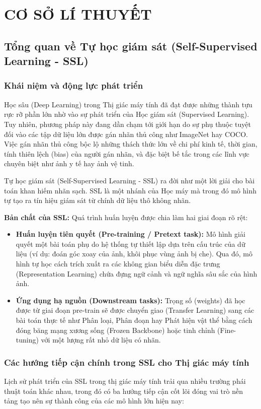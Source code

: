 \chapter{CƠ SỞ LÍ THUYẾT}
\section{Tổng quan về Tự học giám sát (Self-Supervised Learning - SSL)}
\subsection{Khái niệm và động lực phát triển}
Học sâu (Deep Learning) trong Thị giác máy tính đã đạt được những thành tựu rực rỡ phần lớn nhờ vào sự phát triển của Học giám sát (Supervised Learning). Tuy nhiên, phương pháp này đang dần chạm tới giới hạn do sự phụ thuộc tuyệt đối vào các tập dữ liệu lớn được gán nhãn thủ công như ImageNet hay COCO. Việc gán nhãn thủ công bộc lộ những thách thức lớn về chi phí kinh tế, thời gian, tính thiên lệch (bias) của người gán nhãn, và đặc biệt bế tắc trong các lĩnh vực chuyên biệt như ảnh y tế hay ảnh vệ tinh.

Tự học giám sát (Self-Supervised Learning - SSL) ra đời như một lời giải cho bài toán khan hiếm nhãn sạch. SSL là một nhánh của Học máy mà trong đó mô hình tự tạo ra tín hiệu giám sát từ chính dữ liệu thô không nhãn.

\textbf{Bản chất của SSL:} Quá trình huấn luyện được chia làm hai giai đoạn rõ rệt:
\begin{itemize}
    \item \textbf{Huấn luyện tiên quyết (Pre-training / Pretext task):} Mô hình giải quyết một bài toán phụ do hệ thống tự thiết lập dựa trên cấu trúc của dữ liệu (ví dụ: đoán góc xoay của ảnh, khôi phục vùng ảnh bị che). Qua đó, mô hình tự học cách trích xuất ra các không gian biểu diễn đặc trưng (Representation Learning) chứa đựng ngữ cảnh và ngữ nghĩa sâu sắc của hình ảnh.
    \item \textbf{Ứng dụng hạ nguồn (Downstream tasks):} Trọng số (weights) đã học được từ giai đoạn pre-train sẽ được chuyển giao (Transfer Learning) sang các bài toán thực tế như Phân loại, Phân đoạn hay Phát hiện vật thể bằng cách đóng băng mạng xương sống (Frozen Backbone) hoặc tinh chỉnh (Fine-tuning) với một lượng rất nhỏ dữ liệu có nhãn.
\end{itemize}
\subsection{Các hướng tiếp cận chính trong SSL cho Thị giác máy tính}
Lịch sử phát triển của SSL trong thị giác máy tính trải qua nhiều trường phái thuật toán khác nhau, trong đó có ba hướng tiếp cận cốt lõi đóng vai trò nền tảng tạo nên sự thành công của các mô hình lớn hiện nay:
